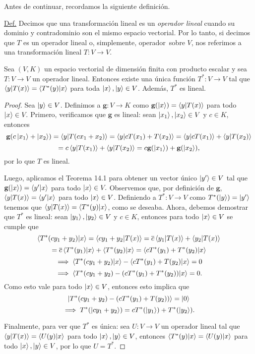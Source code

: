 \documentclass[12pt,libertine]{book}
\begin{document}
Antes de continuar, recordamos la siguiente definición.

\hspace{5mm} 
\begin{tcolorbox}
    \underline{Def.} Decimos que una transformación lineal es un \emph{operador lineal} cuando su dominio y contradominio son el mismo espacio vectorial. Por lo tanto, si decimos que $T$ es un operador lineal \textemdash o, simplemente, operador\textemdash \ sobre $V$, nos referimos a una transformación lineal $T:V\to V$.
\end{tcolorbox}

\vspace{3mm}

\begin{Teo}{14.2}
    Sea $(V,K)$ un espacio vectorial de dimensión finita con producto escalar y sea $T:V\to V$ un operador lineal. Entonces existe una única función $T^*:V\to V$ tal que $\braket{y|T(x)}=\braket{T^*(y)|x}$ para toda $\ket{x},\ket{y}\in V$. Además, $T^*$ es lineal.
    
    \begin{proof}
        Sea $\ket{y}\in V$. Definimos a $\textbf{g}:V\to K$ como $\textbf{g}(\ket{x})=\braket{y|T(x)}$ para todo $\ket{x}\in V.$ Primero, verificamos que $\textbf{g}$ es lineal: sean $\ket{x_1},\ket{x_2}\in V$ y $c\in K$, entonces $$\textbf{g}(c\ket{x_1}+\ket{x_2})=\braket{y|T(cx_1+x_2)}=\braket{y|cT(x_1)+T(x_2)}=\braket{y|cT(x_1)}+\braket{y|T(x_2)}$$ $$=c\braket{y|T(x_1)}+\braket{y|T(x_2)}=c\textbf{g}(\ket{x_1})+\textbf{g}(\ket{x_2}),$$ por lo que $T$ es lineal.
        
        Luego, aplicamos el Teorema 14.1 para obtener un vector único $\ket{y'}\in V$ tal que $\textbf{g}(\ket{x})=\braket{y'|x}$ para todo $\ket{x}\in V.$ Observemos que, por definición de $\textbf{g}$, $\braket{y|T(x)}=\braket{y'|x}$ para todo $\ket{x}\in V$. Definiendo a $T^*:V\to V$ como $T^*(\ket{y})=\ket{y'}$ tenemos que $\braket{y|T(x)}=\braket{T^*(y)|x}$, como se deseaba. Ahora, debemos demostrar que $T^*$ es lineal: sean $\ket{y_1},\ket{y_2}\in V$ y $c\in K$, entonces para todo $\ket{x}\in V$ se cumple que $$\braket{T^*(cy_1+y_2)|x}=\braket{cy_1+y_2|T(x)}=\overline{c}\braket{y_1|T(x)}+\braket{y_2|T(x)}$$ $$=\overline{c}\braket{T^*(y_1)|x}+\braket{T^*(y_2)|x}=\braket{cT^*(y_1)+T^*(y_2)|x}$$ $$\implies\braket{T^*(cy_1+y_2)|x}-\braket{cT^*(y_1)+T(y_2)|x}=0$$ $$\implies \braket{T^*(cy_1+y_2)-(cT^*(y_1)+T^*(y_2))|x}=0.$$ Como esto vale para todo $\ket{x}\in V$, entonces esto implica que $$ \ket{T^*(cy_1+y_2)-(cT^*(y_1)+T(y_2))}=\ket{0}$$ $$\implies T^*(\ket{cy_1+y_2})=cT^*(\ket{y_1})+T^*(\ket{y_2}).$$
        
        Finalmente, para ver que $T^*$ es única: sea $U:V\to V$ un operador lineal tal que $\braket{y|T(x)}=\braket{U(y)|x}$ para todo $\ket{x},\ket{y}\in V$, entonces $\braket{T^*(y)|x}=\braket{U(y)|x}$ para todo $\ket{x},\ket{y}\in V$, por lo que $U=T^*$.
    \end{proof}
\end{Teo}
\end{document}
